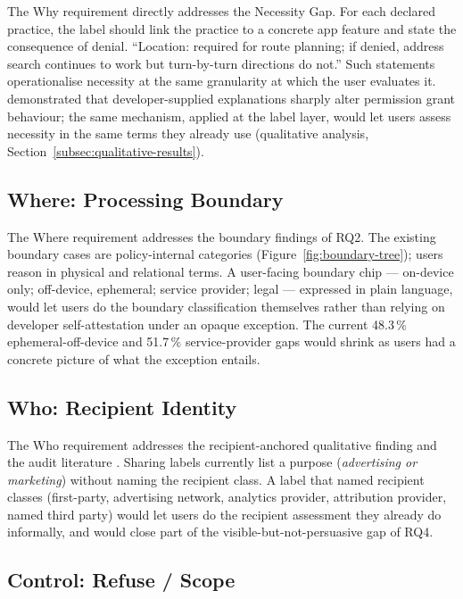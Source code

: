\documentclass[11pt,a4paper]{article}
\begin{document}
The Why requirement directly addresses the Necessity Gap. For each
declared practice, the label should link the practice to a concrete
app feature and state the consequence of denial. ``Location: required
for route planning; if denied, address search continues to work but
turn-by-turn directions do not.'' Such statements operationalise
necessity at the same granularity at which the user evaluates it.
~\citet{tan:etal:2014} demonstrated that developer-supplied
explanations sharply alter permission grant behaviour; the same
mechanism, applied at the label layer, would let users assess
necessity in the same terms they already use (qualitative analysis,
Section~\ref{subsec:qualitative-results}).

\subsection{Where: Processing Boundary}
\label{subsec:design-where}

The Where requirement addresses the boundary findings of RQ2. The
existing boundary cases are policy-internal categories
(Figure~\ref{fig:boundary-tree}); users reason in physical and
relational terms. A user-facing boundary chip --- on-device only;
off-device, ephemeral; service provider; legal --- expressed in plain
language, would let users do the boundary classification themselves
rather than relying on developer self-attestation under an opaque
exception. The current 48.3\,\% ephemeral-off-device and 51.7\,\%
service-provider gaps would shrink as users had a concrete picture of
what the exception entails.

\subsection{Who: Recipient Identity}
\label{subsec:design-who}

The Who requirement addresses the recipient-anchored qualitative
finding and the audit literature
\citep{englehardt:narayanan:2016,andow:etal:2020,razaghpanah:etal:2018}.
Sharing labels currently list a purpose (\emph{advertising or
marketing}) without naming the recipient class. A label that named
recipient classes (first-party, advertising network, analytics provider,
attribution provider, named third party) would let users do the
recipient assessment they already do informally, and would close part
of the visible-but-not-persuasive gap of RQ4.

\subsection{Control: Refuse / Scope}
\label{subsec:design-control}
\end{document}
